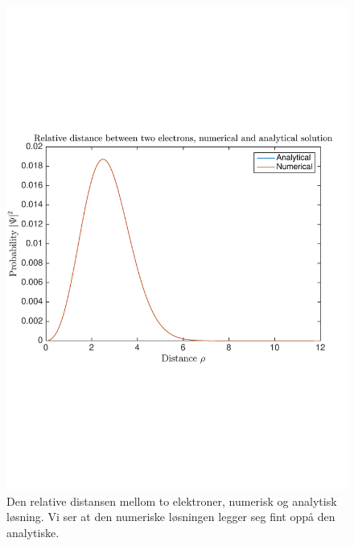 \documentclass[norsk, 12pt]{article}
\theoremstyle{definition} \newtheorem{defi}{Definisjon}[subsection]
\theoremstyle{definition} \newtheorem{teo}{Teorem}[subsection]
\theoremstyle{definition} \newtheorem*{eks}{Eksempel}
\begin{document}
\begin{figure}[H]
\centering
\includegraphics[scale = 0.5, trim = 1cm 7cm 1cm 7cm]{rel_dist_num_anal_hele.pdf}
\caption{Den relative distansen mellom to elektroner, numerisk og analytisk løsning. Vi ser at den numeriske løsningen legger seg fint oppå den analytiske.}
\label{fig:reldisthele}
\end{figure}
\end{document}
